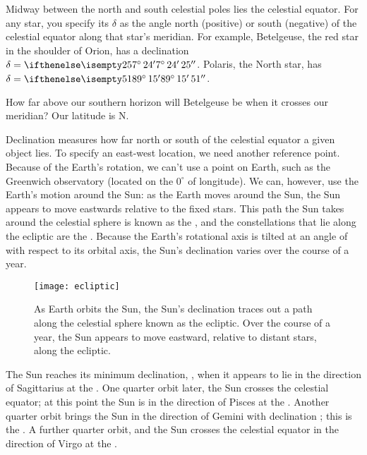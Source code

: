 Midway between the north and south celestial poles lies the celestial equator.  For any star, you specify its  $\delta$ as the angle north (positive) or south (negative) of the celestial equator along that star's meridian.  For example, Betelgeuse, the red star in the shoulder of Orion, has a declination $\delta = \dec{7}{24}{25}$.  Polaris, the North star, has $\delta = \dec{89}{15}{51}$.

\begin{exercisebox}
How far above our southern horizon will Betelgeuse be when it crosses our meridian? Our latitude is N.
\end{exercisebox}

Declination measures how far north or south of the celestial equator a given object lies. To specify an east-west location, we need another reference point.  Because of the Earth's rotation, we can't use a point on Earth, such as the Greenwich observatory (located on the $0^{\circ}$ of longitude).  We can, however, use the Earth's motion around the Sun: as the Earth moves around the Sun, the Sun appears to move eastwards relative to the fixed stars. This path the Sun takes around the celestial sphere is known as the , and the constellations that lie along the ecliptic are the .
Because the Earth's rotational axis is tilted at an angle of  with respect to its orbital axis, the Sun's declination varies over the course of a year.   

\begin{figure}[hb]
\texttt{[image: ecliptic]}
\caption[The ecliptic]{As Earth orbits the Sun, the Sun's declination traces out a path along the celestial sphere known as the ecliptic.  Over the course of a year, the Sun appears to move eastward, relative to distant stars, along the ecliptic.}
\label{f.ecliptic}
\end{figure}

The Sun reaches its minimum declination, , when it appears to lie in the direction of Sagittarius at the .  One quarter orbit later, the Sun crosses the celestial equator; at this point the Sun is in the direction of Pisces at the . Another quarter orbit brings the Sun in the direction of Gemini with declination ; this is the . A further quarter orbit, and the Sun crosses the celestial equator in the direction of Virgo at the .

